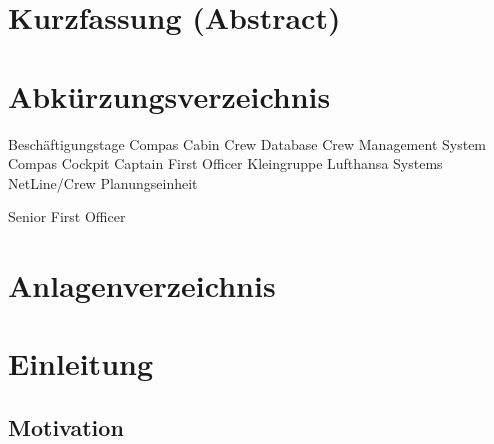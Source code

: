 \documentclass [12pt, a4paper, oneside, titlepage, ngerman]{article}
\begin{document}
\tableofcontents
\newpage


\section*{Kurzfassung (Abstract)}
\newpage


\section*{Abkürzungsverzeichnis}

\begin{acronym}[NL/C]

 {Beschäftigungstage}
 {Compas Cabin}
 {Crew Database}
 {Crew Management System}
 {Compas Cockpit}
 {Captain}
 {First Officer}
 {Kleingruppe}
 {Lufthansa Systems}
 {NetLine/Crew}
 {Planungseinheit}

 {Senior First Officer}



\end{acronym}
\newpage


\listoffigures
\newpage

\section*{Anlagenverzeichnis}
\newpage

\setcounter{page}{1}
\section{Einleitung}
\subsection {Motivation}
\end{document}
